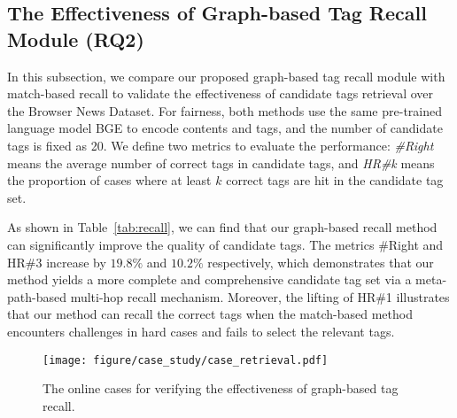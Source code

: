 \subsection{The Effectiveness of Graph-based Tag Recall Module (RQ2)}
\label{sec:exp_retrieval}
In this subsection, we compare our proposed graph-based tag recall module with match-based recall to validate the effectiveness of candidate tags retrieval over the Browser News Dataset. For fairness, both methods use the same pre-trained language model BGE to encode contents and tags, and the number of candidate tags is fixed as 20.
We define two metrics to evaluate the performance: \textit{\#Right} means the average number of correct tags in candidate tags, and \textit{HR\#k} means the proportion of cases where at least $k$ correct tags are hit in the candidate tag set.


\begin{table}[htbp]
	\caption{Performance comparison between different recall types over the Browser News Dataset.}
	\label{tab:recall}
	\centering
\end{table}

As shown in Table~\ref{tab:recall}, we can find that our graph-based recall method can significantly improve the quality of candidate tags. The metrics \#Right and  HR\#3 increase by $19.8\%$ and $10.2\%$ respectively, which demonstrates that our method yields a more complete and comprehensive candidate tag set via a meta-path-based multi-hop recall mechanism. Moreover, the lifting of HR\#1 illustrates that our method can recall the correct tags when the match-based method encounters challenges in hard cases and fails to select the relevant tags.



\begin{figure}[h]
  \centering
  \vspace{-1.0em}
  \texttt{[image: figure/case\_study/case\_retrieval.pdf]}
  \vspace{-1.0em}
  \caption{The online cases for verifying the effectiveness of graph-based tag recall.}
  \label{fig:case_retrieval}
\end{figure}

